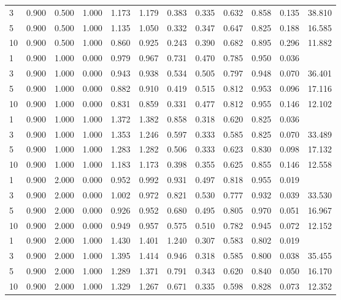 {\begin{longtable}{llllllllllll}
3 & 0.900 & 0.500 & 1.000 & 1.173 & 1.179 & 0.383 & 0.335 & 0.632 & 0.858 & 0.135 & 38.810 \\
5 & 0.900 & 0.500 & 1.000 & 1.135 & 1.050 & 0.332 & 0.347 & 0.647 & 0.825 & 0.188 & 16.585 \\
10 & 0.900 & 0.500 & 1.000 & 0.860 & 0.925 & 0.243 & 0.390 & 0.682 & 0.895 & 0.296 & 11.882 \\
1 & 0.900 & 1.000 & 0.000 & 0.979 & 0.967 & 0.731 & 0.470 & 0.785 & 0.950 & 0.036 &  \\
3 & 0.900 & 1.000 & 0.000 & 0.943 & 0.938 & 0.534 & 0.505 & 0.797 & 0.948 & 0.070 & 36.401 \\
5 & 0.900 & 1.000 & 0.000 & 0.882 & 0.910 & 0.419 & 0.515 & 0.812 & 0.953 & 0.096 & 17.116 \\
10 & 0.900 & 1.000 & 0.000 & 0.831 & 0.859 & 0.331 & 0.477 & 0.812 & 0.955 & 0.146 & 12.102 \\
1 & 0.900 & 1.000 & 1.000 & 1.372 & 1.382 & 0.858 & 0.318 & 0.620 & 0.825 & 0.036 &  \\
3 & 0.900 & 1.000 & 1.000 & 1.353 & 1.246 & 0.597 & 0.333 & 0.585 & 0.825 & 0.070 & 33.489 \\
5 & 0.900 & 1.000 & 1.000 & 1.283 & 1.282 & 0.506 & 0.333 & 0.623 & 0.830 & 0.098 & 17.132 \\
10 & 0.900 & 1.000 & 1.000 & 1.183 & 1.173 & 0.398 & 0.355 & 0.625 & 0.855 & 0.146 & 12.558 \\
1 & 0.900 & 2.000 & 0.000 & 0.952 & 0.992 & 0.931 & 0.497 & 0.818 & 0.955 & 0.019 &  \\
3 & 0.900 & 2.000 & 0.000 & 1.002 & 0.972 & 0.821 & 0.530 & 0.777 & 0.932 & 0.039 & 33.530 \\
5 & 0.900 & 2.000 & 0.000 & 0.926 & 0.952 & 0.680 & 0.495 & 0.805 & 0.970 & 0.051 & 16.967 \\
10 & 0.900 & 2.000 & 0.000 & 0.949 & 0.957 & 0.575 & 0.510 & 0.782 & 0.945 & 0.072 & 12.152 \\
1 & 0.900 & 2.000 & 1.000 & 1.430 & 1.401 & 1.240 & 0.307 & 0.583 & 0.802 & 0.019 &  \\
3 & 0.900 & 2.000 & 1.000 & 1.395 & 1.414 & 0.946 & 0.318 & 0.585 & 0.800 & 0.038 & 35.455 \\
5 & 0.900 & 2.000 & 1.000 & 1.289 & 1.371 & 0.791 & 0.343 & 0.620 & 0.840 & 0.050 & 16.170 \\
10 & 0.900 & 2.000 & 1.000 & 1.329 & 1.267 & 0.671 & 0.335 & 0.598 & 0.828 & 0.073 & 12.352 \\
\bottomrule
\end{longtable}}
